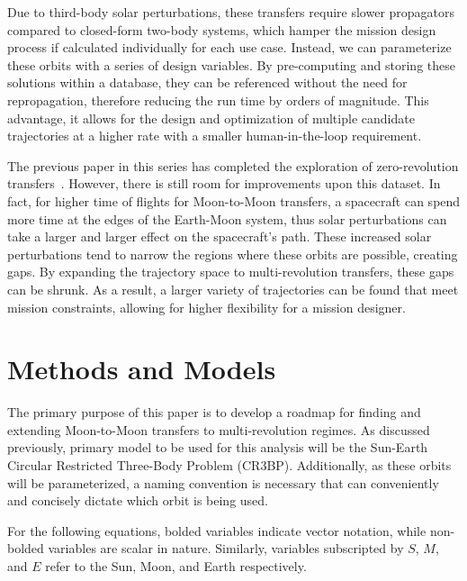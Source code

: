 \documentclass[letterpaper, paper,11pt]{AAS}	%
\begin{document}
Due to third-body solar perturbations, these transfers require slower propagators compared to closed-form two-body systems, which hamper the mission design process if calculated individually for each use case. Instead, we can parameterize these orbits with a series of design variables. By pre-computing and storing these solutions within a database, they can be referenced without the need for repropagation, therefore reducing the run time by orders of magnitude. This advantage, it allows for the design and optimization of multiple candidate trajectories at a higher rate with a smaller human-in-the-loop requirement.

The previous paper in this series has completed the exploration of zero-revolution transfers~\cite{Lantoine2014}. However, there is still room for improvements upon this dataset. In fact, for higher time of flights for Moon-to-Moon transfers, a spacecraft can spend more time at the edges of the Earth-Moon system, thus solar perturbations can take a larger and larger effect on the spacecraft's path. These increased solar perturbations tend to narrow the regions where these orbits are possible, creating gaps. By expanding the trajectory space to multi-revolution transfers, these gaps can be shrunk. As a result, a larger variety of trajectories can be found that meet mission constraints, allowing for higher flexibility for a mission designer.

\section*{Methods and Models}




The primary purpose of this paper is to develop a roadmap for finding and extending Moon-to-Moon transfers to multi-revolution regimes. As discussed previously, primary model to be used for this analysis will be the Sun-Earth Circular Restricted Three-Body Problem (CR3BP). Additionally, as these orbits will be parameterized, a naming convention is necessary that can conveniently and concisely dictate which orbit is being used.

For the following equations, bolded variables indicate vector notation, while non-bolded variables are scalar in nature. Similarly, variables subscripted by \(S\), \(M\), and \(E\) refer to the Sun, Moon, and Earth respectively.
\end{document}
